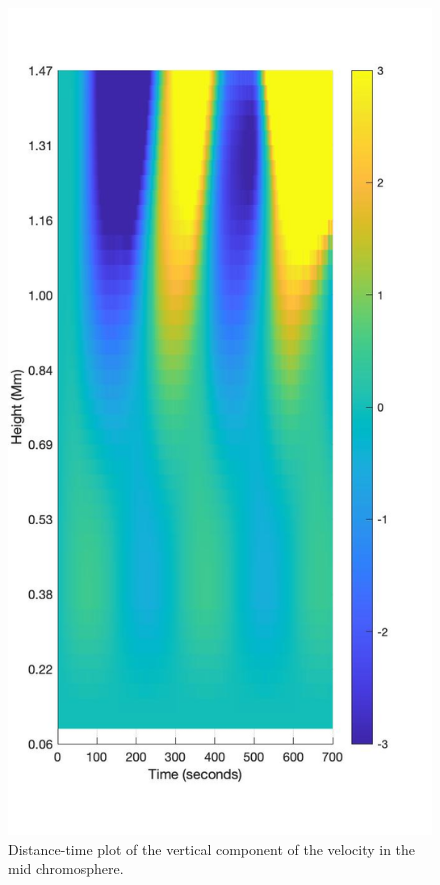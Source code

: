 \documentclass[linenumbers]{aastex63}
\begin{document}
\begin{figure}
\centering
\label{dt_vvert_100G_300s_180s}
\includegraphics[scale=0.3]{dt-5b2_2_100G-midchrom.jpg}
\caption{Distance-time plot of the vertical component of the velocity in the mid chromosphere.}
\end{figure}
\end{document}
